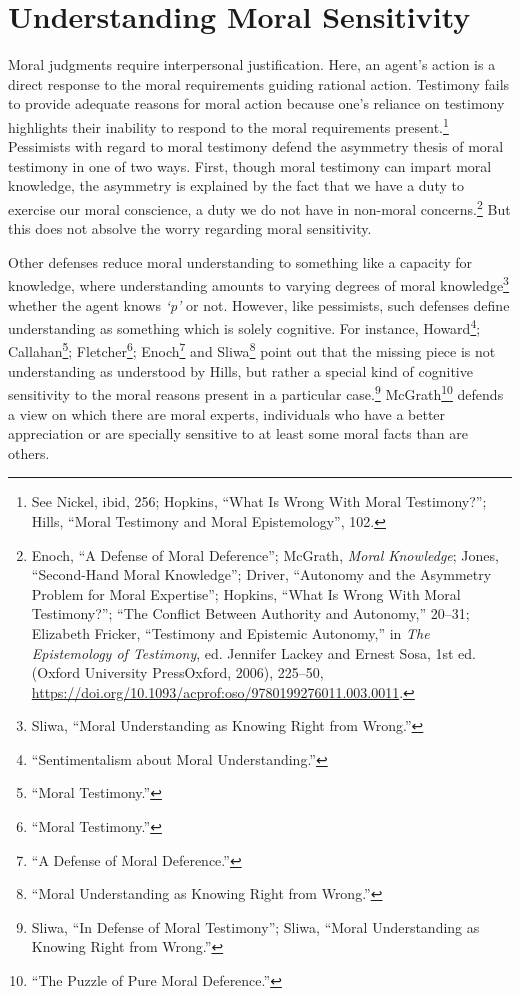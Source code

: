 \documentclass[phdthesis,12pt,final,a4paper]{wuthesis}
\theoremstyle{definition}
\theoremstyle{definition}
\theoremstyle{definition}
\theoremstyle{definition}
\theoremstyle{remark}
\begin{document}
\section{Understanding Moral Sensitivity}\label{understanding-moral-sensitivity}

Moral judgments require interpersonal justification. Here, an agent's action is a direct response to the moral requirements guiding rational action. Testimony fails to provide adequate reasons for moral action because one's reliance on testimony highlights their inability to respond to the moral requirements present.\footnote{See Nickel, ibid, 256; Hopkins, {``What {Is Wrong With Moral Testimony}?''}; Hills, {``Moral Testimony and Moral Epistemology''}, 102.} Pessimists with regard to moral testimony defend the asymmetry thesis of moral testimony in one of two ways. First, though moral testimony can impart moral knowledge, the asymmetry is explained by the fact that we have a duty to exercise our moral conscience, a duty we do not have in non-moral concerns.\footnote{Enoch, {``A {Defense} of {Moral Deference}''}; McGrath, \emph{Moral {Knowledge}}; Jones, {``Second-{Hand Moral Knowledge}''}; Driver, {``Autonomy and the {Asymmetry Problem} for {Moral Expertise}''}; Hopkins, {``What {Is Wrong With Moral Testimony}?''}; {``The {Conflict Between Authority} and {Autonomy},''} 20--31; Elizabeth Fricker, {``Testimony and {Epistemic Autonomy},''} in \emph{The {Epistemology} of {Testimony}}, ed. Jennifer Lackey and Ernest Sosa, 1st ed. (Oxford University PressOxford, 2006), 225--50, \url{https://doi.org/10.1093/acprof:oso/9780199276011.003.0011}.} But this does not absolve the worry regarding moral sensitivity.

Other defenses reduce moral understanding to something like a capacity for knowledge, where understanding amounts to varying degrees of moral knowledge\footnote{Sliwa, {``Moral {Understanding} as {Knowing Right} from {Wrong}.''}} whether the agent knows \emph{`p'} or not. However, like pessimists, such defenses define understanding as something which is solely cognitive. For instance, Howard\footnote{{``Sentimentalism about {Moral Understanding}.''}}; Callahan\footnote{{``Moral {Testimony}.''}}; Fletcher\footnote{{``Moral {Testimony}.''}}; Enoch\footnote{{``A {Defense} of {Moral Deference}.''}} and Sliwa\footnote{{``Moral {Understanding} as {Knowing Right} from {Wrong}.''}} point out that the missing piece is not understanding as understood by Hills, but rather a special kind of cognitive sensitivity to the moral reasons present in a particular case.\footnote{Sliwa, {``In Defense of Moral Testimony''}; Sliwa, {``Moral {Understanding} as {Knowing Right} from {Wrong}.''}} McGrath\footnote{{``The {Puzzle} of {Pure Moral Deference}.''}} defends a view on which there are moral experts, individuals who have a better appreciation or are specially sensitive to at least some moral facts than are others.
\end{document}
